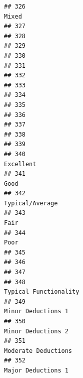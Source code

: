 \documentclass[
]{article}
\begin{document}
\begin{verbatim}
## 326                                                                                      Mixed
## 327                                                                                           
## 328                                                                                           
## 329                                                                                           
## 330                                                                                           
## 331                                                                                           
## 332                                                                                           
## 333                                                                                           
## 334                                                                                           
## 335                                                                                           
## 336                                                                                           
## 337                                                                                           
## 338                                                                                           
## 339                                                                                           
## 340                                                                                  Excellent
## 341                                                                                       Good
## 342                                                                            Typical/Average
## 343                                                                                       Fair
## 344                                                                                       Poor
## 345                                                                                           
## 346                                                                                           
## 347                                                                                           
## 348                                                                      Typical Functionality
## 349                                                                         Minor Deductions 1
## 350                                                                         Minor Deductions 2
## 351                                                                        Moderate Deductions
## 352                                                                         Major Deductions 1

\end{verbatim}
\end{document}
